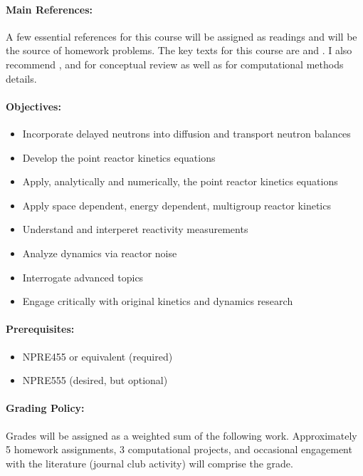 \documentclass[11pt]{article}
\begin{document}
\paragraph{Main References:}
A few essential references for this course will be assigned as readings and 
will be the source of homework problems. The key texts for this course are
\cite{ott_introductory_1985} and
\cite{hetrick_dynamics_1993}.
I also recommend 
\cite{stacey_nuclear_2007}, \cite{bell_nuclear_1970} and
\cite{duderstadt_transport_1979} for conceptual review as well as
\cite{lewis_computational_1993} for computational methods details.

\renewcommand{\refname}{\normalfont\selectfont\normalsize}


\paragraph{Objectives:}
\begin{itemize}
\item Incorporate delayed neutrons into diffusion and transport neutron balances
\item Develop the point reactor kinetics equations
\item Apply, analytically and numerically, the point reactor kinetics equations
\item Apply space dependent, energy dependent, multigroup reactor kinetics
\item Understand and interperet reactivity measurements
\item Analyze dynamics via reactor noise
\item Interrogate advanced topics 
\item Engage critically with original kinetics and dynamics research
\end{itemize}

\paragraph{Prerequisites:}
\begin{itemize}
        \item NPRE455 or equivalent (required) 
        \item NPRE555 (desired, but optional)
\end{itemize}

\paragraph{Grading Policy:} Grades will be assigned as a weighted sum of the
following work. Approximately 5 homework assignments, 3 computational projects, 
and occasional engagement with the literature (journal club activity) will comprise the 
grade.
\end{document}
